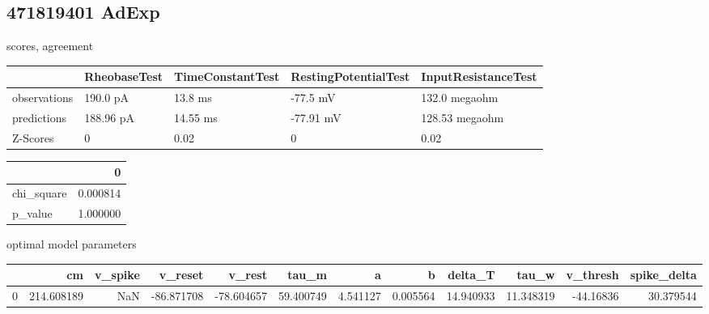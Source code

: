 \subsection{471819401 AdExp} scores, agreement\begin{tabular}{lllll}
\toprule
{} & RheobaseTest & TimeConstantTest & RestingPotentialTest & InputResistanceTest \\
\midrule
observations &     190.0 pA &          13.8 ms &             -77.5 mV &       132.0 megaohm \\
predictions  &    188.96 pA &         14.55 ms &            -77.91 mV &      128.53 megaohm \\
Z-Scores     &            0 &             0.02 &                    0 &                0.02 \\
\bottomrule
\end{tabular}
\begin{tabular}{lr}
\toprule
{} &         0 \\
\midrule
chi\_square &  0.000814 \\
p\_value    &  1.000000 \\
\bottomrule
\end{tabular}
optimal model parameters\begin{tabular}{lrrrrrrrrrrr}
\toprule
{} &          cm &  v\_spike &    v\_reset &     v\_rest &      tau\_m &         a &         b &    delta\_T &      tau\_w &  v\_thresh &  spike\_delta \\
\midrule
0 &  214.608189 &      NaN & -86.871708 & -78.604657 &  59.400749 &  4.541127 &  0.005564 &  14.940933 &  11.348319 & -44.16836 &    30.379544 \\
\bottomrule
\end{tabular}
